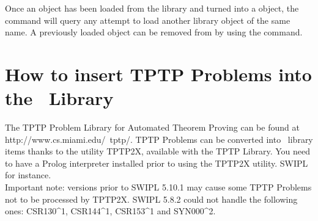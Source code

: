 Once an object has been loaded from the library and turned into a {\TPS} object,
the  command will query any attempt to load another library object
of the same name. A previously loaded object can be removed from {\TPS} by using the 
command.

\section{How to insert TPTP Problems into the \TPS~Library}

The TPTP Problem Library for Automated Theorem Proving can be found at
http://www.cs.miami.edu/~tptp/.
TPTP Problems can be converted into \TPS~library items thanks to the utility TPTP2X, available with the TPTP Library. You need to have a Prolog interpreter installed prior to using the TPTP2X
utility. SWIPL for instance.\\

Important note: versions prior to SWIPL 5.10.1 may cause some TPTP Problems
not to be processed by TPTP2X. SWIPL 5.8.2 could not handle the following
ones: CSR130\textasciicircum 1, CSR144\textasciicircum 1,
CSR153\textasciicircum 1 and SYN000\textasciicircum 2.

